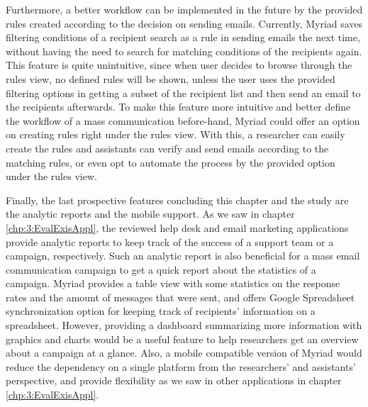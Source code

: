 Furthermore, a better workflow can be implemented in the future by the provided rules created according to the decision on sending emails. Currently, Myriad saves filtering conditions of a recipient search as a rule in sending emails the next time, without having the need to search for matching conditions of the recipients again. This feature is quite unintuitive, since when user decides to browse through the rules view, no defined rules will be shown, unless the user uses the provided filtering options in getting a subset of the recipient list and then send an email to the recipients afterwards. To make this feature more intuitive and better define the workflow of a mass communication before-hand, Myriad could offer an option on creating rules right under the rules view. With this, a researcher can easily create the rules and assistants can verify and send emails according to the matching rules, or even opt to automate the process by the provided option under the rules view.
\vspace{1cm}

Finally, the last prospective features concluding this chapter and the study are the analytic reports and the mobile support. As we saw in chapter \ref{chp:3:EvalExisAppl}, the reviewed help desk and email marketing applications provide analytic reports to keep track of the success of a support team or a campaign, respectively. Such an analytic report is also beneficial for a mass email communication campaign to get a quick report about the statistics of a campaign. Myriad provides a table view with some statistics on the response rates and the amount of messages that were sent, and offers Google Spreadsheet synchronization option for keeping track of recipients' information on a spreadsheet. However, providing a dashboard summarizing more information with graphics and charts would be a useful feature to help researchers get an overview about a campaign at a glance. Also, a mobile compatible version of Myriad would reduce the dependency on a single platform from the researchers' and assistants' perspective, and provide flexibility as we saw in other applications in chapter \ref{chp:3:EvalExisAppl}.

\clearemptydoublepage 